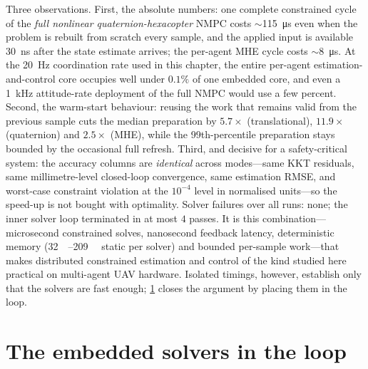 Three observations. First, the absolute numbers: one complete constrained cycle
of the \emph{full nonlinear quaternion-hexacopter} NMPC costs
$\sim$\SI{115}{\micro\second} even when the problem is rebuilt from scratch every
sample, and the applied input is available \SI{30}{\nano\second} after the
state estimate arrives; the per-agent MHE cycle costs
$\sim$\SI{8}{\micro\second}. At the \SI{20}{\hertz} coordination rate used in
this chapter, the entire per-agent estimation-and-control core occupies well
under $0.1\%$ of one embedded core, and even a \SI{1}{\kilo\hertz} attitude-rate
deployment of the full NMPC would use a few percent. Second, the warm-start
behaviour: reusing the work that remains valid from the previous sample cuts the
median preparation by $5.7\times$ (translational), $11.9\times$ (quaternion) and
$2.5\times$ (MHE), while the 99th-percentile preparation stays bounded by the
occasional full refresh. Third, and decisive for a
safety-critical system: the accuracy columns are \emph{identical} across
modes---same KKT residuals, same millimetre-level closed-loop convergence, same
estimation RMSE, and worst-case constraint violation at the
$10^{-4}$ level in normalised units---so the speed-up is not bought with
optimality. Solver failures over all runs: none; the inner solver loop
terminated in at most $4$ passes. It is this combination---microsecond
constrained solves, nanosecond feedback latency, deterministic memory
(\SIrange{32}{209}{\kilo\byte} static per solver) and bounded per-sample
work---that makes distributed constrained estimation and control of the kind
studied here practical on multi-agent UAV hardware. Isolated timings, however,
establish only that the solvers are fast enough; \cref{sec:sim-inloop} closes
the argument by placing them in the loop.

\section{The embedded solvers in the loop}
\label{sec:sim-inloop}

